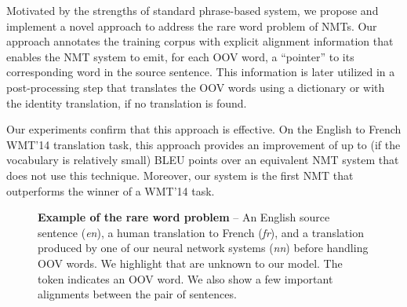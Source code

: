 Motivated by the strengths of standard phrase-based system, we
propose and implement a novel approach to address the rare word problem of NMTs.
Our approach annotates the training corpus with 
explicit alignment information that enables the NMT system to emit, for each OOV word, a
``pointer'' to its corresponding word in the source sentence. This
information is later utilized in a post-processing step that translates
the OOV words using a dictionary or with the identity translation, if no translation is found.

Our experiments confirm that this approach is effective. On the English to French WMT'14
translation task, this approach provides an improvement of
up to \bestunkimp{} (if the vocabulary is relatively small) 
BLEU points over an equivalent NMT system that does not use this technique.
Moreover, our system is the first NMT that outperforms the winner of a WMT'14 task.

\begin{figure*}[tbh!]
\caption[Example of the rare word problem]{{\bf Example of the rare word problem} -- An English source sentence ({\it en}), a human translation to French ({\it fr}), and a translation produced by one of our neural network systems ({\it nn}) before handling OOV words. We highlight  that are unknown to our model. 
The token \unksym{} indicates an OOV word. 
We also show a few important alignments between the pair of sentences. 
}
\label{f:sent_pair}
\end{figure*}


